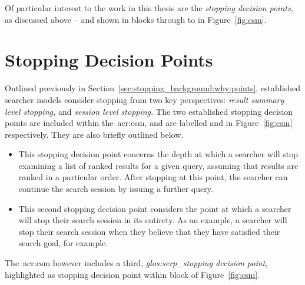 Of particular interest to the work in this thesis are the \emph{stopping decision points}, as discussed above -- and shown in blocks  through to  in Figure~\ref{fig:csm}.

\section{Stopping Decision Points}\label{sec:csm:stopping}
Outlined previously in Section~\ref{sec:stopping_background:why:points}, established searcher models consider stopping from two key perspectives: \emph{result summary level stopping,} and \emph{session level stopping.} The two established stopping decision points are included within the~\gls{acr:csm}, and are labelled  and  in Figure~\ref{fig:csm} respectively. They are also briefly outlined below.

\begin{itemize}
    \item[\blueboxbold{1}]{ This stopping decision point concerns the depth at which a searcher will stop examining a list of ranked results for a given query, assuming that results are ranked in a particular order. After stopping at this point, the searcher can continue the search session by issuing a further query.}
    \item[\blueboxbold{2}]{ This second stopping decision point considers the point at which a searcher will stop their search session in its entirety. As an example, a searcher will stop their search session when they believe that they have satisfied their search goal, for example.}
\end{itemize}

The~\gls{acr:csm} however includes a third, \emph{\gls{glos:serp_stopping} decision point,} highlighted as stopping decision point  within block  of Figure~\ref{fig:csm}.

